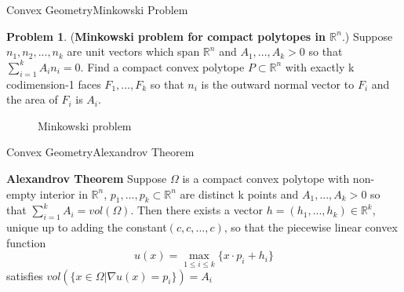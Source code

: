 \documentclass{beamer}
\theoremstyle{definition}
\newtheorem{mypro}{Problem}
\begin{document}
\begin{frame}{Convex Geometry}{Minkowski Problem}
\begin{mypro}
(\textbf{Minkowski problem for compact polytopes in $\mathbb{R}^n$}.) Suppose $n_1, n_2, ..., n_k$ are unit vectors which span $\mathbb{R}^n$ and $A_1,..., A_k>0$ so that $\sum^k_{i=1}A_in_i=0$. Find a compact convex polytope $P\subset \mathbb{R}^n$ with exactly k codimension-1 faces $F_1,...,F_k$ so that $n_i$ is the outward normal vector to $F_i$ and the area of $F_i$ is $A_i$.
\end{mypro}
\begin{figure}
\centering
{}
\caption{Minkowski problem}
\label{fig:Mink}
\end{figure}
\end{frame}

\begin{frame}{Convex Geometry}{Alexandrov Theorem}
\begin{theorem}
\textbf{Alexandrov Theorem} Suppose $\Omega$ is a compact convex polytope with non-empty interior in $\mathbb{R}^n$, $p_1, ... , p_k\subset \mathbb{R}^n$ are distinct k points and $A_1,...,A_k>0$ so that $\sum^k_{i=1}A_i=vol(\Omega)$. Then there exists a vector $h =(h_1,...,h_k)\in \mathbb{R}^k$, unique up to adding the constant$(c,c,...,c)$, so that the piecewise linear convex function $$u(x)=\max_{1\leq i\leq k}\{x\cdot p_i + h_i\}$$ satisfies $vol(\{x\in \Omega | \nabla u(x)=p_i\})=A_i$
\end{theorem}
\end{frame}
\end{document}
